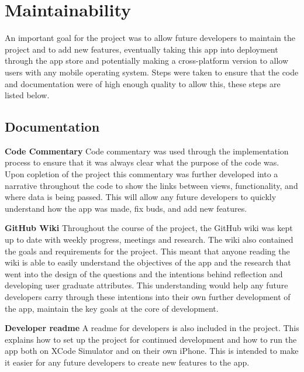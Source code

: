 \documentclass{l4proj}
\begin{document}
\section{Maintainability}
An important goal for the project was to allow future developers to maintain the project and to add new features, eventually taking this app into 
deployment through the app store and potentially making a cross-platform version to allow users with any mobile operating system. Steps were taken to ensure that 
the code and documentation were of high enough quality to allow this, these steps are listed below.

\subsection{Documentation}

\textbf{Code Commentary} Code commentary was used through the implementation process to ensure that it was always clear what the purpose of the code was. Upon
copletion of the project this commentary was further developed into a narrative throughout the code to show the links between views, functionality, and where
data is being passed. This will allow any future developers to quickly understand how the app was made, fix buds, and add new features.

\textbf{GitHub Wiki} Throughout the course of the project, the GitHub wiki was kept up to date with weekly progress, meetings and research. The wiki also 
contained the goals and requirements for the project. This meant that anyone reading the wiki is able to easily understand the objectives of the app
and the research that went into the design of the questions and the intentions behind reflection and developing user graduate attributes. This understanding
would help any future developers carry through these intentions into their own further development of the app, maintain the key goals at the core
of development. 

\textbf{Developer readme} A readme for developers is also included in the project. This explains how to set up the project for continued development and how
to run the app both on XCode Simulator and on their own iPhone. This is intended to make it easier for any future developers to create new features
to the app. 


\end{document}

